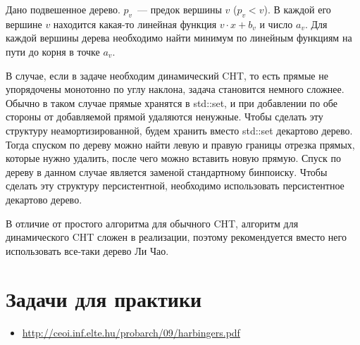 \begin{exercise}
    Дано подвешенное дерево. $p_v$~--- предок вершины $v$ ($p_v < v$). В каждой его вершине $v$ находится какая-то линейная функция $v \cdot x + b_v$ и число $a_v$. Для каждой вершины дерева необходимо найти минимум по линейным функциям на пути до корня в точке $a_v$.
\end{exercise}

В случае, если в задаче необходим динамический CHT, то есть прямые не упорядочены монотонно по углу наклона, задача становится немного сложнее. Обычно в таком случае прямые хранятся в std::set, и при добавлении по обе стороны от добавляемой прямой удаляются ненужные. Чтобы сделать эту структуру неамортизированной, будем хранить вместо std::set декартово дерево. Тогда спуском по дереву можно найти левую и правую границы отрезка прямых, которые нужно удалить, после чего можно вставить новую прямую. Спуск по дереву в данном случае является заменой стандартному бинпоиску. Чтобы сделать эту структуру персистентной, необходимо использовать персистентное декартово дерево.

В отличие от простого алгоритма для обычного CHT, алгоритм для динамического CHT сложен в реализации, поэтому рекомендуется вместо него использовать все-таки дерево Ли Чао.

\section{Задачи для практики}

\begin{itemize}
    
    \item \href{http://ceoi.inf.elte.hu/probarch/09/harbingers.pdf}{http://ceoi.inf.elte.hu/probarch/09/harbingers.pdf}
\end{itemize}

